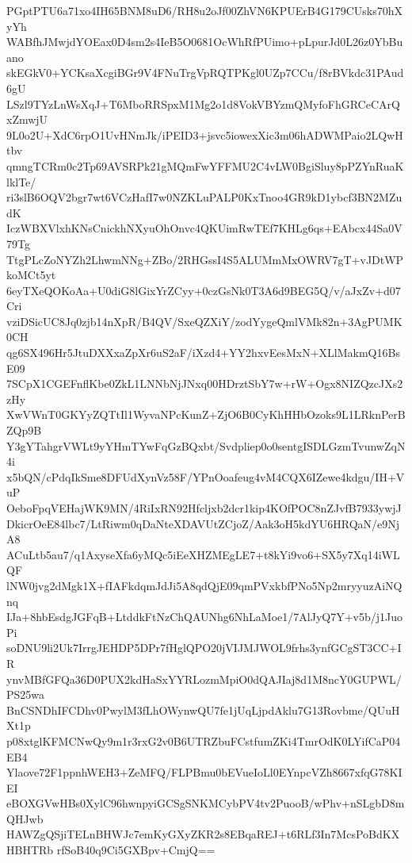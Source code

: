PGptPTU6a71xo4IH65BNM8uD6/RH8u2oJf00ZhVN6KPUErB4G179CUsks70hXyYh
WABfhJMwjdYOEax0D4sm2s4IeB5O0681OcWhRfPUimo+pLpurJd0L26z0YbBuano
skEGkV0+YCKsaXcgiBGr9V4FNuTrgVpRQTPKgl0UZp7CCu/f8rBVkdc31PAud6gU
LSzl9TYzLnWsXqJ+T6MboRRSpxM1Mg2o1d8VokVBYzmQMyfoFhGRCeCArQxZmwjU
9L0o2U+XdC6rpO1UvHNmJk/iPEID3+jsvc5iowexXic3m06hADWMPaio2LQwHtbv
qmngTCRm0c2Tp69AVSRPk21gMQmFwYFFMU2C4vLW0BgiSluy8pPZYnRuaKlklTe/
ri3slB6OQV2bgr7wt6VCzHafI7w0NZKLuPALP0KxTnoo4GR9kD1ybcf3BN2MZudK
IczWBXVlxhKNsCnickhNXyuOhOnvc4QKUimRwTEf7KHLg6qs+EAbcx44Sa0V79Tg
TtgPLcZoNYZh2LhwmNNg+ZBo/2RHGssI4S5ALUMmMxOWRV7gT+vJDtWPkoMCt5yt
6eyTXeQOKoAa+U0diG8lGixYrZCyy+0czGsNk0T3A6d9BEG5Q/v/aJxZv+d07Cri
vziDSicUC8Jq0zjb14nXpR/B4QV/SxeQZXiY/zodYygeQmlVMk82n+3AgPUMK0CH
qg6SX496Hr5JtuDXXxaZpXr6uS2aF/iXzd4+YY2hxvEesMxN+XLlMakmQ16BsE09
7SCpX1CGEFnflKbe0ZkL1LNNbNjJNxq00HDrztSbY7w+rW+Ogx8NIZQzcJXs2zHy
XwVWnT0GKYyZQTtIl1WyvaNPcKunZ+ZjO6B0CyKhHHbOzoks9L1LRknPerBZQp9B
Y3gYTahgrVWLt9yYHmTYwFqGzBQxbt/Svdpliep0o0sentgISDLGzmTvunwZqN4i
x5bQN/cPdqIkSme8DFUdXynVz58F/YPnOoafeug4vM4CQX6IZewe4kdgu/IH+VuP
OeboFpqVEHajWK9MN/4RiIxRN92Hfcljxb2dcr1kip4KOfPOC8nZJvfB7933ywjJ
DkicrOeE84lbc7/LtRiwm0qDaNteXDAVUtZCjoZ/Aak3oH5kdYU6HRQaN/e9NjA8
ACuLtb5au7/q1AxyseXfa6yMQc5iEeXHZMEgLE7+t8kYi9vo6+SX5y7Xq14iWLQF
lNW0jvg2dMgk1X+fIAFkdqmJdJi5A8qdQjE09qmPVxkbfPNo5Np2mryyuzAiNQnq
IJa+8hbEsdgJGFqB+LtddkFtNzChQAUNhg6NhLaMoe1/7AlJyQ7Y+v5b/j1JuoPi
soDNU9li2Uk7IrrgJEHDP5DPr7fHglQPO20jVIJMJWOL9frhs3ynfGCgST3CC+IR
ynvMBfGFQa36D0PUX2kdHaSxYYRLozmMpiO0dQAJIaj8d1M8ncY0GUPWL/PS25wa
BnCSNDhIFCDhv0PwylM3fLhOWynwQU7fe1jUqLjpdAklu7G13Rovbme/QUuHXt1p
p08xtglKFMCNwQy9m1r3rxG2v0B6UTRZbuFCstfumZKi4TmrOdK0LYifCaP04EB4
Ylaove72F1ppnhWEH3+ZeMFQ/FLPBmu0bEVueIoLl0EYnpcVZh8667xfqG78KIEI
eBOXGVwHBs0XylC96hwnpyiGCSgSNKMCybPV4tv2PuooB/wPhv+nSLgbD8mQHJwb
HAWZgQSjiTELnBHWJc7emKyGXyZKR2s8EBqaREJ+t6RLf3In7McsPoBdKXHBHTRb
rfSoB40q9Ci5GXBpv+CmjQ==
